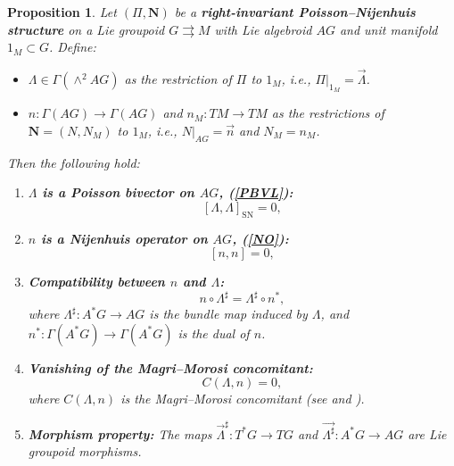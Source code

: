 \documentclass{article}
\newcommand{\SN}{\mathrm{SN}}
\newcommand{\II}{\Pi}
\newcommand{\NN}{\mathbf{N}}
\newcommand{\LL}{\Lambda}
\newtheorem{proposition}[theorem]{Proposition}
\begin{document}
\begin{proposition}\label{prop1}
Let $(\II, \NN)$ be a \textbf{right-invariant Poisson–Nijenhuis structure} on a Lie groupoid $G \rightrightarrows M$ with Lie algebroid $AG$ and unit manifold $1_M \subset G$. Define:
\begin{itemize}
    \item $\LL \in \Gamma(\wedge^2 AG)$ as the restriction of $\II$ to $1_M$, i.e., $\II|_{1_M} = \vec{\LL}$.
    \item $n: \Gamma(AG) \to \Gamma(AG)$ and $n_M: TM \to TM$ as the restrictions of $\NN = (N, N_M)$ to $1_M$, i.e., $N|_{AG} = \vec{n}$ and $N_M = n_M$.
\end{itemize}
Then the following hold:

\begin{enumerate}
    \item \textbf{$\LL$ is a Poisson bivector on $AG$, (\ref{PBVL}):}
    \[
    [\LL, \LL]_{\SN} = 0,
    \]

    \item \textbf{$n$ is a Nijenhuis operator on $AG$, (\ref{NO}):}
    \[
    [n, n] = 0,
    \]
      \item \textbf{Compatibility between $n$ and $\LL$:}
    \[
    n \circ \LL^{\sharp} = \LL^{\sharp} \circ n^{*},
    \]
    where $\LL^{\sharp}: A^*G \to AG$ is the bundle map induced by $\LL$, and $n^{*}: \Gamma(A^*G) \to \Gamma(A^*G)$ is the dual of $n$.

    \item \textbf{Vanishing of the Magri–Morosi concomitant:}
    \[
    C(\LL, n) = 0,
    \]
    where $C(\LL, n)$ is the Magri–Morosi concomitant (see \cite{Kosman2} and \cite{Magri}).

    \item \textbf{Morphism property:}
    The maps $\vec{\LL}^{\sharp}: T^{*}G \to TG$ and $\overrightarrow{\LL^{\sharp}}: A^{*}G \to AG$ are Lie groupoid morphisms.
\end{enumerate}
\end{proposition}
\end{document}
